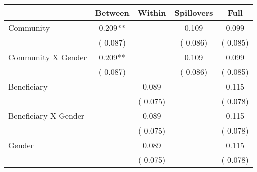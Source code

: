 
\begin{tabular}{l*{4}{c}}\hline&\multicolumn{1}{c}{Between}&\multicolumn{1}{c}{Within}&\multicolumn{1}{c}{Spillovers}&\multicolumn{1}{c}{Full}\\ \hline
 Community                                     &              0.209**      &                                               &        0.109 &         0.099                            \\ 
                                                       &        (       0.087)           &                                       &       (       0.086)     &      (       0.085)                                           \\ 
 Community X Gender            &              0.209**      &                                               &        0.109 &         0.099                            \\ 
                                                       &        (       0.087)           &                                       &       (       0.086)     &      (       0.085)                                           \\ 
 Beneficiary                           &                                               &        0.089    &                                &             0.115                            \\ 
                                                       &                                               & (       0.075)                  &                                        &      (       0.078)                                           \\ 
 Beneficiary X Gender          &                                               &        0.089    &                                &             0.115                            \\ 
                                                       &                                               & (       0.075)                  &                                        &      (       0.078)                                           \\ 
 Gender                                        &                              &        0.089    &                                &             0.115                            \\ 
                                                       &                                               & (       0.075)                  &                                        &      (       0.078)                                           \\ 

\end{tabular}
